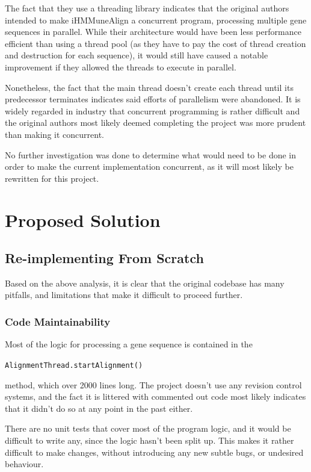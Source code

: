 \documentclass[a4paper,12pt]{report}
\begin{document}
The fact that they use a threading library indicates that the original authors intended to make iHMMuneAlign a concurrent program, processing multiple gene sequences in parallel. While their architecture would have been less performance efficient than using a thread pool (as they have to pay the cost of thread creation and destruction for each sequence), it would still have caused a notable improvement if they allowed the threads to execute in parallel.

Nonetheless, the fact that the main thread doesn't create each thread until its predecessor terminates indicates said efforts of parallelism were abandoned. It is widely regarded in industry that concurrent programming is rather difficult and the original authors most likely deemed completing the project was more prudent than making it concurrent.

No further investigation was done to determine what would need to be done in order to make the current implementation concurrent, as it will most likely be rewritten for this project.

\chapter{Proposed Solution}

\section{Re-implementing From Scratch}

Based on the above analysis, it is clear that the original codebase has many pitfalls, and limitations that make it difficult to proceed further.

\subsection{Code Maintainability}
Most of the logic for processing a gene sequence is contained in the \begin{center}
  \texttt{AlignmentThread.startAlignment()}
\end{center}
method, which over 2000 lines long. The project doesn't use any revision control systems, and the fact it is littered with commented out code most likely indicates that it didn't do so at any point in the past either.

There are no unit tests that cover most of the program logic, and it would be difficult to write any, since the logic hasn't been split up. This makes it rather difficult to make changes, without introducing any new subtle bugs, or undesired behaviour.
\end{document}
